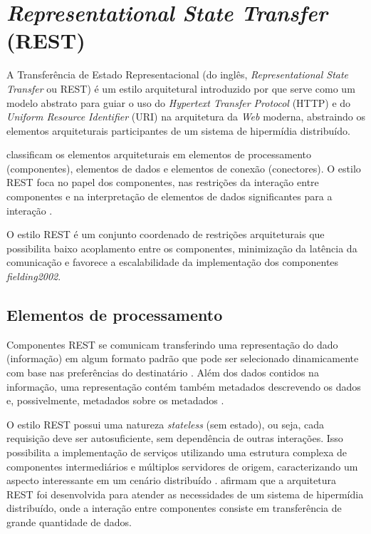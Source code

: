 \section{\textit{Representational State Transfer} (REST) }

  A Transferência de Estado Representacional (do inglês, \textit{Representational State Transfer} ou REST)
  é um estilo arquitetural introduzido por  que serve como um modelo abstrato
  para guiar o uso do \textit{Hypertext Transfer Protocol} (HTTP) e do \textit{Uniform Resource Identifier} (URI)
  na arquitetura da \textit{Web} moderna, abstraindo os elementos arquiteturais participantes de um sistema de
  hipermídia distribuído.
  
   classificam os elementos arquiteturais em elementos de processamento (componentes),
  elementos de dados e elementos de conexão (conectores). O estilo REST foca no papel dos componentes, nas restrições
  da interação entre componentes e na interpretação de elementos de dados significantes para a interação \cite{fielding2002}.
  
  O estilo REST é um conjunto coordenado de restrições arquiteturais que possibilita baixo acoplamento entre os componentes,
  minimização da latência da comunicação e favorece a escalabilidade da implementação dos componentes \textit{fielding2002}.
  
  \subsection{Elementos de processamento}
  
    Componentes REST se comunicam transferindo uma representação do dado (informação) em algum formato padrão que pode
    ser selecionado dinamicamente com base nas preferências do destinatário \cite{fielding2002}. Além dos dados contidos na 
    informação, uma representação contém também metadados descrevendo os dados e, possivelmente, metadados sobre os
    metadados \cite{fielding2002}.
    
    O estilo REST possui uma natureza \textit{stateless} (sem estado), ou seja, cada requisição deve ser autosuficiente, sem
    dependência de outras interações. Isso possibilita a implementação de serviços utilizando uma estrutura complexa de componentes
    intermediários e múltiplos servidores de origem, caracterizando um aspecto interessante em um cenário distribuído \cite{fielding2002}.
     afirmam que a arquitetura REST foi desenvolvida para atender as necessidades de um sistema de
    hipermídia distribuído, onde a interação entre componentes consiste em transferência de grande quantidade de dados.
    
